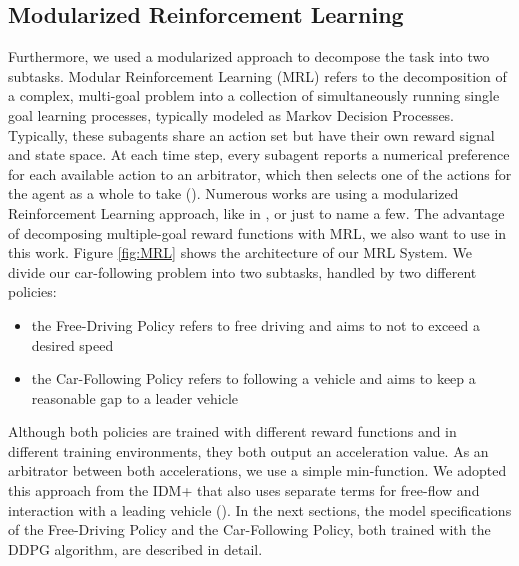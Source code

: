 \documentclass[review]{elsarticle}
\providecommand{\3}{{\ss}}
\begin{document}
	
	\subsection{\label{MRL}Modularized Reinforcement Learning}
	Furthermore, we used a modularized approach to decompose the task into two subtasks. Modular Reinforcement Learning (MRL) refers to the decomposition of a complex, multi-goal
	problem into a collection of simultaneously running single goal learning processes, typically modeled as Markov Decision Processes. Typically, these subagents share an action set but have their own reward signal and state space. At each
	time step, every subagent reports a numerical preference for
	each available action to an arbitrator, which then selects one
	of the actions for the agent as a whole to take (\cite{MRL}). Numerous works are using a modularized Reinforcement Learning approach, like in \cite{MRLexample1}, \cite{MRLexample2} or \cite{MRLexample3} just to name a few. The advantage of decomposing multiple-goal reward functions with MRL, we also want to use in this work. 
	Figure \ref{fig:MRL} shows the architecture of our MRL System. We divide our car-following problem into two subtasks, handled by two different policies: 
	\begin{itemize}
		\item the Free-Driving Policy refers to free driving and aims to not to exceed a desired speed
		\item the Car-Following Policy refers to following a vehicle and aims to keep a reasonable gap to a leader vehicle  	
	\end{itemize}
	Although both policies are trained with different reward functions and in different training environments, they both output an acceleration value. As an arbitrator between both accelerations, we use a simple min-function. We adopted this approach from the IDM+ that also uses separate terms for free-flow and interaction with a leading vehicle (\cite{idm_plus}). In the next sections, the model specifications of the Free-Driving Policy and the Car-Following Policy, both trained with the DDPG algorithm, are described in detail.
	
\end{document}
